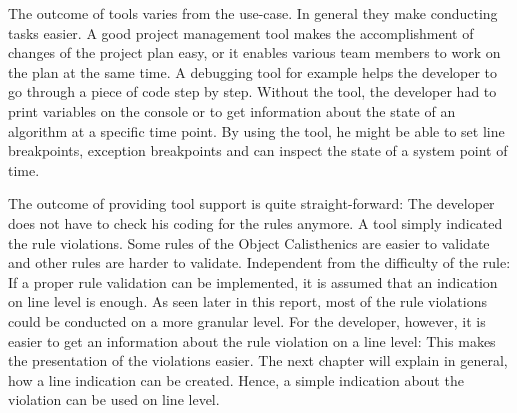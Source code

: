 The outcome of tools varies from the use-case. In general they make conducting tasks easier. A good project management tool makes the accomplishment of changes of the project plan easy, or it enables various team members to work on the plan at the same time. A debugging tool for example helps the developer to go through a piece of code step by step. Without the tool, the developer had to print variables on the console or to get information about the state of an algorithm at a specific time point. By using the tool, he might be able to set line breakpoints, exception breakpoints and can inspect the state of a system point of time. 

The outcome of providing tool support is quite straight-forward: The developer does not have to check his coding for the rules anymore. A tool simply indicated the rule violations. Some rules of the Object Calisthenics are easier to validate and other rules are harder to validate. Independent from the difficulty of the rule: If a proper rule validation can be implemented, it is assumed that an indication on line level is enough. As seen later in this report, most of the rule violations could be conducted on a more granular level. For the developer, however, it is easier to get an information about the rule violation on a line level: This makes the presentation of the violations easier. The next chapter will explain in general, how a line indication can be created. Hence, a simple indication about the violation can be used on line level. 

